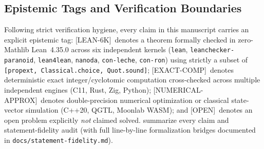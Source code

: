 \documentclass[11pt,reqno]{amsart}
\theoremstyle{definition}
\newcommand{\taglean}{\textsf{[LEAN-6K]}}
\newcommand{\tagcomp}{\textsf{[EXACT-COMP]}}
\newcommand{\tagnum}{\textsf{[NUMERICAL-APPROX]}}
\newcommand{\tagopen}{\textsf{[OPEN]}}
\begin{document}
\subsection{Epistemic Tags and Verification Boundaries}
Following strict verification hygiene, every claim in this manuscript carries an explicit
epistemic tag:
\taglean\ denotes a theorem formally checked in zero-Mathlib Lean~4.35.0 across six
independent kernels (\texttt{lean}, \texttt{leanchecker-paranoid}, \texttt{lean4lean},
\texttt{nanoda}, \texttt{con-leche}, \texttt{con-ron}) using strictly a subset of
\texttt{[propext, Classical.choice, Quot.sound]};
\tagcomp\ denotes deterministic exact integer/cyclotomic computation cross-checked across
multiple independent engines (C11, Rust, Zig, Python);
\tagnum\ denotes double-precision numerical optimization or classical state-vector
simulation (C++20, QGTL, Moonlab WASM); and
\tagopen\ denotes an open problem explicitly \emph{not} claimed solved.
 summarize every claim and statement-fidelity audit
(with full line-by-line formalization bridges documented in \texttt{docs/statement-fidelity.md}).
\end{document}
